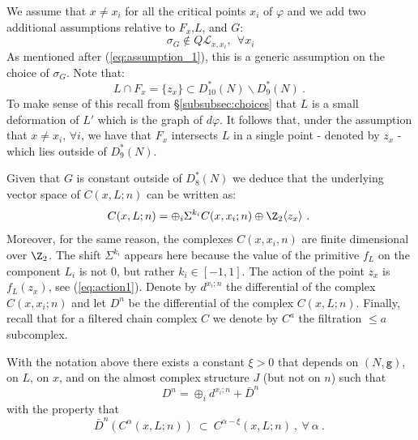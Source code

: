 We assume that $x\not= x_{i}$ for all the critical points $x_{i}$ of $\varphi$ and we add two additional assumptions relative to $F_{x}$,$L$, and $G$:
\begin{equation}\label{eq:sigma_2}
\sigma_{G}\not\in Q\mathcal{L}_{x,x_{i}}, \ \ \forall x_{i} \end{equation}
As mentioned after (\ref{eq:assumption_1}), this is a generic assumption on the choice
of $\sigma_{G}$. Note that:
\begin{equation}\label{eq:inters}
L\cap F_{x}= \{z_{x}\} \subset D^{\ast}_{10}(N)\backslash D^{\ast}_{9}(N)~.~
\end{equation}
To make sense of this recall from \S\ref{subsubsec:choices} that $L$ is a small deformation of $L'$ which is the graph of $d\varphi$. It follows that, under the assumption that $x\not= x_{i}$, $\forall i$, we have that $F_{x}$ intersects $L$ in a single point - denoted by $z_{x}$ - which lies outside of $D^{\ast}_{9}(N)$. 
 
Given that $G$ is constant outside of $D^{\ast}_{8}(N)$ we deduce that the  underlying
 vector space of $C(x,L; n)$ can be written as:
 \begin{equation} C(x,L;n)=\oplus_{i}\Sigma^{k_{i}} C(x,x_{i};n)\oplus \Z_2 \langle z_{x} \rangle ~.~
 \end{equation} 
 Moreover, for the same reason, the complexes $C(x,x_{i},n)$ are finite dimensional over $\Z_{2}$. The shift $\Sigma^{k_{i}}$ appears here because the value of the primitive 
 $f_{L}$ on the component $L_{i}$ is not $0$, but rather $k_{i}\in [-1,1]$. The action of the point $z_{x}$ is $f_{L}(z_{x})$, see (\ref{eq:action1}). Denote by $d^{x_{i};n}$ the differential of the complex $C(x,x_{i};n)$ and let 
 $D^{n}$ be the differential of the complex $C(x,L;n)$.  Finally, recall that for a filtered chain complex $C$ we denote by $C^{a}$ the filtration $\leq a$ subcomplex. 
 \begin{lem} \label{lem:defor}With the notation above there exists a constant $\xi>0$ that depends
 on $(N,\mathtt{g})$, on $L$, on $x$, and on the almost complex structure $J$ (but not on $n$) such 
 that $$ D^{n} = \oplus_{i} d^{x_{i};n} + \bar{D}^{n}$$ with the property that
 $$\bar{D}^{n}(C^{\alpha}(x,L;n))\ \subset \ C^{\alpha-\xi}(x,L;n) \ , \ \forall \ \alpha  
 ~.~$$
 \end{lem}
 
